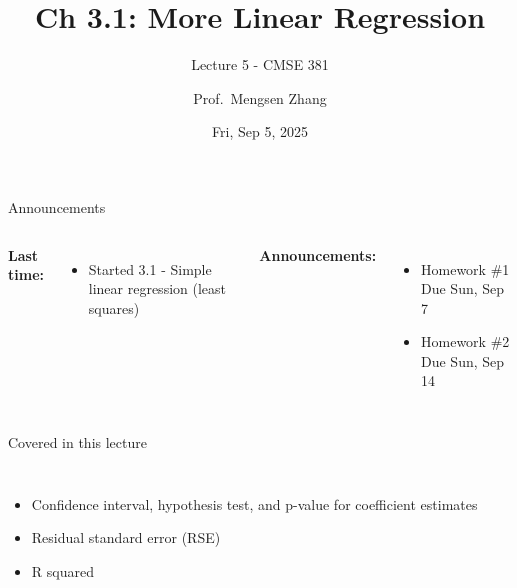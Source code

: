 \documentclass[aspectratio=169,usenames,dvipsnames]{beamer}
\begin{document}
\title[]{Ch 3.1: More Linear Regression}
\subtitle{Lecture 5 - CMSE 381}
\date{Fri, Sep 5, 2025}



\author[Dr.~Zhang]{Prof.~Mengsen Zhang}

\begin{frame}
 \titlepage


\end{frame}
\begin{frame}[c]{Announcements}

\begin{columns}
\centering

	\textbf{Last time:}
	\begin{itemize}
		\item Started 3.1 - Simple linear regression (least squares)
	\end{itemize}
\centering

	\textbf{Announcements:}
	\begin{itemize}
		\item Homework \#1 Due Sun, Sep 7
		\item Homework \#2 Due Sun, Sep 14
	\end{itemize}
\end{columns}

\end{frame}
\begin{frame}[c]{Covered in this lecture }

\begin{columns}
\centering
\begin{itemize}
	\item Confidence interval, hypothesis test, and p-value for coefficient estimates
	\item Residual standard error (RSE)
	\item R squared
\end{itemize}
\centering

\end{columns}

\end{frame}
\end{document}
